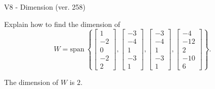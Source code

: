 \begin{exercise}
  \begin{exerciseTitle}V8 - Dimension (ver. 258)\end{exerciseTitle}
  \begin{exerciseStatement}
    Explain how to find the dimension of 
\[W=\mathrm{span}\ \left\{\left[\begin{array}{r}
1 \\
-2 \\
0 \\
-2 \\
2
\end{array}\right] , \left[\begin{array}{r}
-3 \\
-4 \\
1 \\
-3 \\
1
\end{array}\right] , \left[\begin{array}{r}
-3 \\
-4 \\
1 \\
-3 \\
1
\end{array}\right] , \left[\begin{array}{r}
-4 \\
-12 \\
2 \\
-10 \\
6
\end{array}\right]\right\}.\]



  \end{exerciseStatement}
  \begin{exerciseAnswer}
   The dimension of \(W\) is  \(2\).
  


  \end{exerciseAnswer}
\end{exercise}